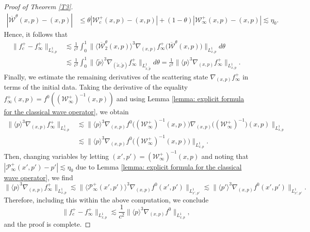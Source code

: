 \documentclass[reqno, 11pt, letterpaper]{amsart}
\theoremstyle{remark}
\numberwithin{equation}{section}
\numberwithin{theorem}{section}
\numberwithin{table}{section}
\numberwithin{figure}{section}
\begin{document}
\begin{proof}[Proof of Theorem \ref{T3}]
$$\begin{aligned}
|\overline{\mathcal{W}}^\theta(x,p)-(x,p)|&\leq \theta |\mathcal{W}_c^+(x,p)-(x,p)|+(1-\theta)|\mathcal{W}_\infty^+(x,p)-(x,p)|\lesssim\eta_0.
\end{aligned}$$
Hence, it follows that 
$$\begin{aligned}
\|f_c^+-f_\infty^+\|_{L_{x,p}^1}&\lesssim\frac{1}{c^{2}}\int_0^1\Big\|\langle \overline{\mathcal{W}}_2^\theta(x,p) \rangle^3 \nabla_{(x,p)}f_\infty^+\Big(\overline{\mathcal{W}}^\theta(x,p)\Big)\Big\|_{L_{x,p}^1}  d\theta\\
&\lesssim\frac{1}{c^{2}}\int_0^1\big\|\langle \tilde{p} \rangle^3 \nabla_{(\tilde{x},\tilde{p})}f_\infty^+\big\|_{L_{\tilde{x},\tilde{p}}^1}  d\theta=\frac{1}{c^{2}}\big\|\langle p \rangle^3 \nabla_{(x,p)}f_\infty^+\big\|_{L_{x,p}^1}.
\end{aligned}$$
Finally, we estimate the remaining derivatives of the scattering state $\nabla_{(x,p)}f_\infty^+$ in terms of the initial data. Taking the derivative of the equality $f^+_\infty(x,p)=f^0((\mathcal{W}^+_\infty)^{-1}(x,p))$ and using Lemma \ref{lemma: explicit formula for the classical wave operator}, we obtain
$$\begin{aligned}
\big\|\langle p \rangle^3 \nabla_{(x,p)}f_\infty^+\big\|_{L_{x,p}^1}&\lesssim\Big\|\langle p \rangle^3\nabla_{(x,p)}f^0\Big((\mathcal{W}^+_\infty)^{-1}(x,p)\Big)\nabla_{(x,p)}\Big((\mathcal{W}_\infty^+)^{-1}\Big)(x,p)\Big\|_{L_{x,p}^1}\\
&\lesssim\Big\|\langle p \rangle^3\nabla_{(x,p)}f^0\Big((\mathcal{W}^+_\infty)^{-1}(x,p)\Big)\Big\|_{L_{x,p}^1}.
\end{aligned}$$
Then, changing variables by letting $(x',p')=(\mathcal{W}^+_\infty)^{-1}(x,p)$ and noting that $|\mathcal{P}_\infty^+(x',p')-p'|\lesssim\eta_0$ due to Lemma \ref{lemma: explicit formula for the classical wave operator}, we find
$$\big\|\langle p \rangle^3 \nabla_{(x,p)}f_\infty^+\big\|_{L_{x,p}^1}\lesssim\|\langle \mathcal{P}_\infty^+(x',p')\rangle^3\nabla_{(x,p)}f^0(x',p')\|_{L_{x',p'}^1}\lesssim\|\langle p'\rangle^3\nabla_{(x,p)}f^0(x',p')\|_{L_{x',p'}^1}.$$
Therefore, including this within the above computation, we conclude 
$$\|f_c^+-f_\infty^+\|_{L_{x,p}^1}\lesssim\frac{1}{c^{2}}\|\langle p \rangle^3\nabla_{(x,p)}f^0\|_{L_{x,p}^1},$$ 
and the proof is complete.
\end{proof}
\end{document}
